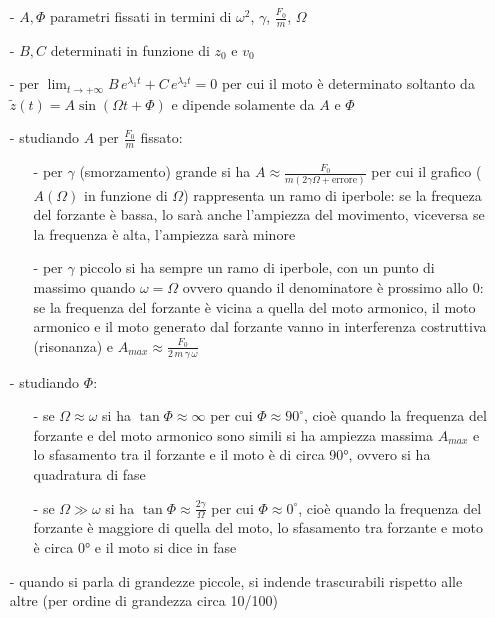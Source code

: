 \documentclass[a4paper]{article}
\begin{document}
\begin{itemize}[topsep=3pt, itemsep=0pt]
	\item[-] \(A, \Phi\) parametri fissati in termini di \(\omega^2\), \(\gamma\), \(\frac{F_0}{m}\), \(\Omega\)
	\item[-] \(B, C\) determinati in funzione di \(z_0\) e \(v_0\)
	\item[-] per \(\displaystyle \lim_{t \to +\infty} B \, e^{\lambda_1 t} + C \, e^{\lambda_2 t} = 0\) per cui il moto è determinato
	soltanto da \(\tilde{z}(t) = A \sin (\Omega t + \Phi)\) e dipende solamente da \(A\) e \(\Phi\)
	\item[-] studiando \(A\) per \(\frac{F_0}{m}\) fissato:
	\begin{itemize}[topsep=3pt, itemsep=0pt]
		\item[-] per \(\gamma\) (smorzamento) grande si ha \(\displaystyle A \approx \frac{F_0}{m (2 \gamma \Omega + \text{errore})}\)
		per cui il grafico (\(A(\Omega)\) in funzione di \(\Omega\)) rappresenta un ramo di iperbole: se la frequeza del forzante
		è bassa, lo sarà anche l'ampiezza del movimento, viceversa se la frequenza è alta, l'ampiezza sarà minore
		\item[-] per \(\gamma\) piccolo si ha sempre un ramo di iperbole, con un punto di massimo quando \(\omega = \Omega\) ovvero
		quando il denominatore è prossimo allo 0: se la frequenza del forzante è vicina a quella del moto armonico, il moto armonico
		e il moto generato dal forzante vanno in interferenza costruttiva (risonanza) e \(\displaystyle A_{max} \approx \frac{F_0}{2 \, m \, \gamma \, \omega}\)
	\end{itemize}
	\item[-] studiando \(\Phi\):
	\begin{itemize}[topsep=3pt, itemsep=0pt]
		\item[-] se \(\Omega \approx \omega\) si ha \(\tan \Phi \approx \infty\) per cui \(\Phi \approx 90^\circ\), cioè quando la
		frequenza del forzante e del moto armonico sono simili si ha ampiezza massima \(A_{max}\) e lo sfasamento tra il forzante e
		il moto è di circa 90°, ovvero si ha quadratura di fase
		\item[-] se \(\Omega \gg \omega\) si ha \(\tan \Phi \approx \frac{2 \gamma}{\Omega}\) per cui \(\Phi \approx 0^\circ\), cioè
		quando la frequenza del forzante è maggiore di quella del moto, lo sfasamento tra forzante e moto è circa 0° e il moto si
		dice in fase
	\end{itemize}
	\item[-] quando si parla di grandezze piccole, si indende trascurabili rispetto alle altre (per ordine di grandezza circa 10/100)
\end{itemize}
\end{document}
